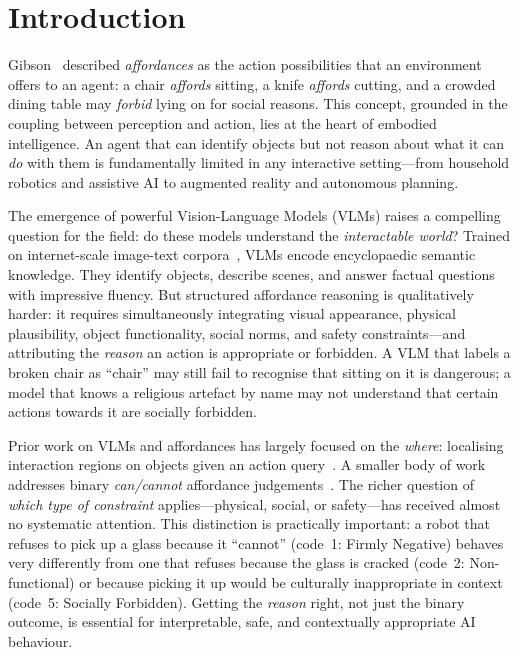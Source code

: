 \documentclass[runningheads]{llncs}
\begin{document}
\section{Introduction}
\label{sec:intro}

Gibson~\cite{gibson1979ecological} described \emph{affordances} as the
action possibilities that an environment offers to an agent: a chair
\emph{affords} sitting, a knife \emph{affords} cutting, and a crowded
dining table may \emph{forbid} lying on for social reasons. This concept,
grounded in the coupling between perception and action, lies at the heart
of embodied intelligence. An agent that can identify objects but not
reason about what it can \emph{do} with them is fundamentally limited in
any interactive setting—from household robotics and assistive AI to
augmented reality and autonomous planning.

The emergence of powerful Vision-Language Models (VLMs) raises a
compelling question for the field: do these models understand the
\emph{interactable world}? Trained on internet-scale image-text
corpora~\cite{gpt4,claude,gemini}, VLMs encode encyclopaedic semantic
knowledge. They identify objects, describe scenes, and answer factual
questions with impressive fluency. But structured affordance reasoning is
qualitatively harder: it requires simultaneously integrating visual
appearance, physical plausibility, object functionality, social norms, and
safety constraints—and attributing the \emph{reason} an action is
appropriate or forbidden. A VLM that labels a broken chair as ``chair''
may still fail to recognise that sitting on it is dangerous; a model that
knows a religious artefact by name may not understand that certain actions
towards it are socially forbidden.

Prior work on VLMs and affordances has largely focused on the
\emph{where}: localising interaction regions on objects given an action
query~\cite{affordancellm,luo2022grounded}. A smaller body of work
addresses binary \emph{can/cannot} affordance
judgements~\cite{gao2023physically,context_aff2026}. The richer question
of \emph{which type of constraint} applies—physical, social, or safety—has
received almost no systematic attention. This distinction is practically
important: a robot that refuses to pick up a glass because it
``cannot'' (code~1: Firmly Negative) behaves very differently from one
that refuses because the glass is cracked (code~2: Non-functional) or
because picking it up would be culturally inappropriate in context
(code~5: Socially Forbidden). Getting the \emph{reason} right, not just
the binary outcome, is essential for interpretable, safe, and contextually
appropriate AI behaviour.
\end{document}
